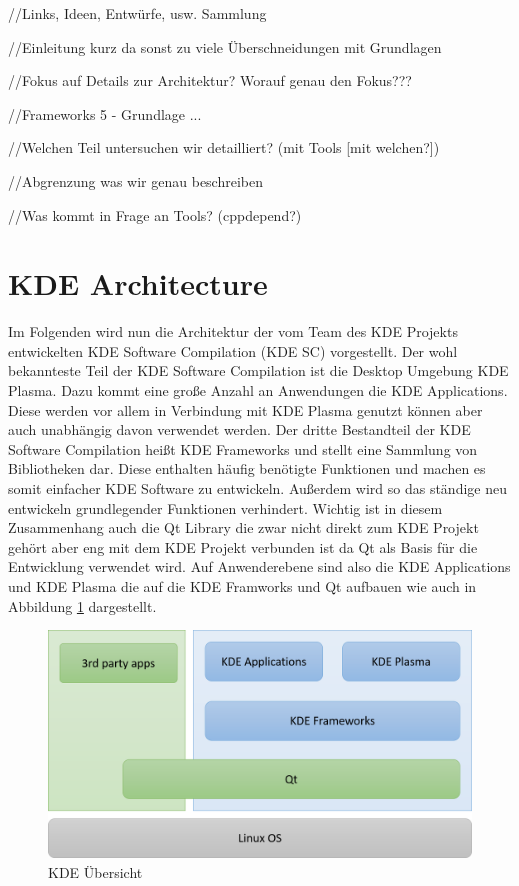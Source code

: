 \documentclass[10pt,a4paper,twocolumn]{article}
\begin{document}
	
//Links, Ideen, Entwürfe, usw. Sammlung

//Einleitung kurz da sonst zu viele Überschneidungen mit Grundlagen

//Fokus auf Details zur Architektur? Worauf genau den Fokus???

//Frameworks 5 - Grundlage ...

//Welchen Teil untersuchen wir detailliert? (mit Tools [mit welchen?])

//Abgrenzung was wir genau beschreiben

//Was kommt in Frage an Tools? (cppdepend?)

\section{KDE Architecture}
Im Folgenden wird nun die Architektur der vom Team des KDE Projekts entwickelten KDE Software Compilation (KDE SC) vorgestellt. Der wohl bekannteste Teil der KDE Software Compilation ist die Desktop Umgebung KDE Plasma. Dazu kommt eine große Anzahl an Anwendungen die KDE Applications. Diese werden vor allem in Verbindung mit KDE Plasma genutzt können aber auch unabhängig davon verwendet werden. Der dritte Bestandteil der KDE Software Compilation heißt KDE Frameworks und stellt eine Sammlung von Bibliotheken dar. Diese enthalten häufig benötigte Funktionen und machen es somit einfacher KDE Software zu entwickeln. Außerdem wird so das ständige neu entwickeln grundlegender Funktionen verhindert. Wichtig ist in diesem Zusammenhang auch die Qt Library die zwar nicht direkt zum KDE Projekt gehört aber eng mit dem KDE Projekt verbunden ist da Qt als Basis für die Entwicklung verwendet wird. Auf Anwenderebene sind also die KDE Applications und KDE Plasma die auf die KDE Framworks und Qt aufbauen wie auch in Abbildung \ref{fig:kde_overview} dargestellt.
\begin{figure}[h]
\centering
\includegraphics[width=0.9\columnwidth]{images/KDE_Aufbau.png}
\caption{KDE Übersicht}
\label{fig:kde_overview}
\end{figure}
\end{document}
